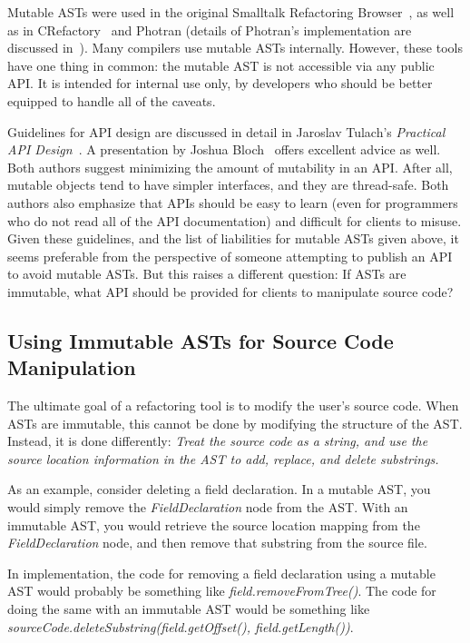 \documentclass[prodmode]{acmlarge}
\begin{document}
Mutable ASTs were used in the original Smalltalk Refactoring
Browser~\cite{roberts97refactoring}, as well as in
CRefactory~\cite{garrido05program} and
Photran (details of Photran's implementation are discussed
in~\cite{sle2008}).  Many compilers use mutable ASTs internally.  However, these
tools have one thing in common: the mutable AST is not accessible via any
public API.  It is intended for internal use only, by developers who should be
better equipped to handle all of the caveats.

Guidelines for API design are discussed in detail in Jaroslav Tulach's
\textit{Practical API Design}~\cite{tulach08practical}.  A presentation by
Joshua Bloch~\cite{bloch} offers excellent advice as well.  Both authors
suggest minimizing the amount of mutability in an API.  After all, mutable
objects tend to have simpler interfaces, and they are thread-safe.  Both
authors also emphasize that APIs should be easy to learn (even for programmers
who do not read all of the API documentation) and difficult for clients to
misuse.  Given these guidelines, and the list of liabilities for mutable ASTs
given above, it seems preferable from the perspective of someone attempting to
publish an API to avoid mutable ASTs.  But this raises a different question: If
ASTs are immutable, what API should be provided for clients to manipulate
source code?

\subsection{Using Immutable ASTs for Source Code Manipulation}
\label{ss:manip}

The ultimate goal of a refactoring tool is to modify the user's source code.
When ASTs are immutable, this cannot be done by modifying the structure of the
AST.  Instead, it is done differently: \textit{Treat the source code as a
string, and use the source location information in the AST to add, replace, and
delete substrings.}

As an example, consider deleting a field declaration.  In a mutable AST, you
would simply remove the \textit{FieldDeclaration} node from the AST.  With an
immutable AST, you would retrieve the source location mapping from the
\textit{FieldDeclaration} node, and then remove that substring from the source
file.

In implementation, the code for removing a field declaration using a mutable
AST would probably be something like \textit{field.removeFromTree()}.  The code
for doing the same with an immutable AST would be something like
\textit{sourceCode.deleteSubstring(field.getOffset(), field.getLength())}.
\end{document}
